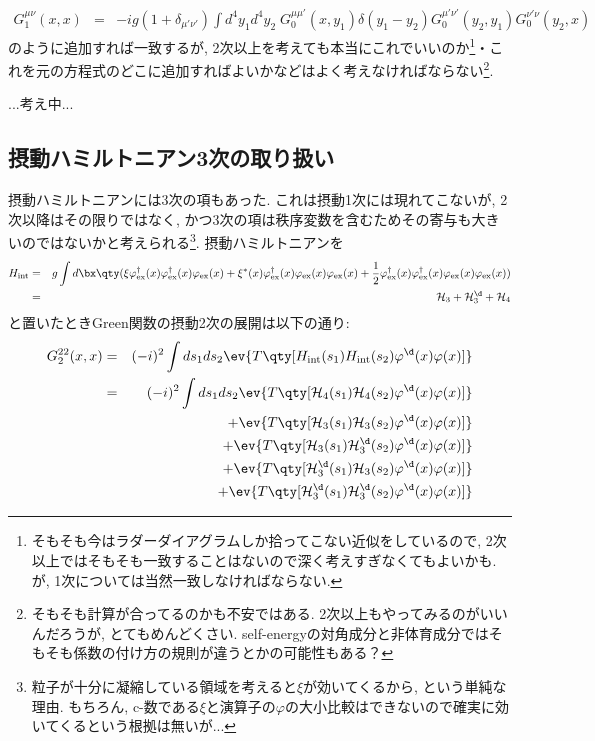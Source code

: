 \documentclass[10.5pt,a4paper]{jreport}
\begin{document}
\begin{eqnarray}
  G^{\mu\nu}_1(x, x) &=& -ig(1+\delta_{\mu'\nu'})\int d^4y_1d^4y_2\;G_0^{\mu\mu'}(x, y_1)\delta(y_1 - y_2)G_0^{\mu'\nu'}(y_2, y_1)G_0^{\nu'\nu}(y_2, x)
\end{eqnarray}
のように追加すれば一致するが, 2次以上を考えても本当にこれでいいのか\footnote{そもそも今はラダーダイアグラムしか拾ってこない近似をしているので, 2次以上ではそもそも一致することはないので深く考えすぎなくてもよいかも. が, 1次については当然一致しなければならない. }・これを元の方程式のどこに追加すればよいかなどはよく考えなければならない\footnote{そもそも計算が合ってるのかも不安ではある. 2次以上もやってみるのがいいんだろうが, とてもめんどくさい. self-energyの対角成分と非体育成分ではそもそも係数の付け方の規則が違うとかの可能性もある？}.

...考え中...
\subsection{摂動ハミルトニアン3次の取り扱い}
摂動ハミルトニアンには3次の項もあった. これは摂動1次には現れてこないが, 2次以降はその限りではなく, かつ3次の項は秩序変数を含むためその寄与も大きいのではないかと考えられる\footnote{粒子が十分に凝縮している領域を考えると$\xi$が効いてくるから, という単純な理由. もちろん, c-数である$\xi$と演算子の$\varphi$の大小比較はできないので確実に効いてくるという根拠は無いが...}. 摂動ハミルトニアンを
\begin{eqnarray}
  \nonumber  H_{\rm int} &=& g\int d\bx \qty(\xi \varphi_{\rm ex}^\dagger(x)\varphi_{\rm ex}^\dagger(x)\varphi_{\rm ex}(x) + \xi^*(x)\varphi_{\rm ex}^\dagger(x)\varphi_{\rm ex}(x)\varphi_{\rm ex}(x) + \frac12\varphi_{\rm ex}^\dagger(x)\varphi_{\rm ex}^\dagger(x)\varphi_{\rm ex}(x)\varphi_{\rm ex}(x))\\
  &=& {\cal H}_3 + {\cal H}_3^\d + {\cal H}_4
\end{eqnarray}
と置いたときGreen関数の摂動2次の展開は以下の通り:
\begin{eqnarray}
  \nonumber  G_2^{22}(x, x) &=& (-i)^2\int ds_1ds_2\ev{T\qty[H_{\rm int}(s_1)H_{\rm int}(s_2)\varphi^\d(x)\varphi(x)]}\\
  &=& (-i)^2\int ds_1ds_2\ev{T\qty[{\cal H}_4(s_1){\cal H}_4(s_2)\varphi^\d(x)\varphi(x)]}\\
  &&\hspace{2.0cm} + \ev{T\qty[{\cal H}_3(s_1){\cal H}_3(s_2)\varphi^\d(x)\varphi(x)]}\label{2nd-Green-first}\\
  &&\hspace{2.0cm} + \ev{T\qty[{\cal H}_3(s_1){\cal H}^\d_3(s_2)\varphi^\d(x)\varphi(x)]}\\
  &&\hspace{2.0cm} + \ev{T\qty[{\cal H}^\d_3(s_1){\cal H}_3(s_2)\varphi^\d(x)\varphi(x)]}\\
  &&\hspace{2.0cm} + \ev{T\qty[{\cal H}^\d_3(s_1){\cal H}^\d_3(s_2)\varphi^\d(x)\varphi(x)]}\label{2nd-Green-final}
\end{eqnarray}
\end{document}
